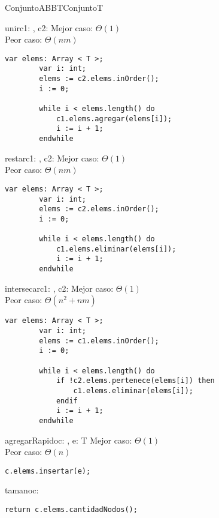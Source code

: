 \begin{module}{ConjuntoABB}{T}{Conjunto}{T}
	\begin{proc}{unir}{\Inout c1: \moduletype, \In c2: \moduletype}{}
		Mejor caso: $\Theta(1)$\\
		Peor caso: $\Theta(nm)$
		\begin{lstlisting}[numbers=none,frame=none]
		var elems: Array < T >;
		var i: int;
		elems := c2.elems.inOrder();
		i := 0;

		while i < elems.length() do
			c1.elems.agregar(elems[i]);
			i := i + 1;
		endwhile
		\end{lstlisting}
	\end{proc}

	\begin{proc}{restar}{\Inout c1: \moduletype, \In c2: \moduletype}{}
		Mejor caso: $\Theta(1)$\\
		Peor caso: $\Theta(nm)$
		\begin{lstlisting}[numbers=none,frame=none]
		var elems: Array < T >;
		var i: int;
		elems := c2.elems.inOrder();
		i := 0;

		while i < elems.length() do
			c1.elems.eliminar(elems[i]);
			i := i + 1;
		endwhile
		\end{lstlisting}
	\end{proc}

	\pagebreak

	\begin{proc}{intersecar}{\Inout c1: \moduletype, \In c2: \moduletype}{}
		Mejor caso: $\Theta(1)$\\
		Peor caso: $\Theta(n^2 + nm)$
		\begin{lstlisting}[numbers=none,frame=none]
		var elems: Array < T >;
		var i: int;
		elems := c1.elems.inOrder();
		i := 0;

		while i < elems.length() do
			if !c2.elems.pertenece(elems[i]) then
				c1.elems.eliminar(elems[i]);
			endif
			i := i + 1;
		endwhile
		\end{lstlisting}
	\end{proc}

	\begin{proc}{agregarRapido}{\Inout c: \moduletype, \In e: T}{}
		Mejor caso: $\Theta(1)$\\
		Peor caso: $\Theta(n)$
		\begin{lstlisting}[numbers=none,frame=none]
		c.elems.insertar(e);
		\end{lstlisting}
	\end{proc}

	\begin{proc}{tamano}{\In c: \moduletype}{\Int}
		\begin{lstlisting}[numbers=none,frame=none]
		return c.elems.cantidadNodos();
		\end{lstlisting}
	\end{proc}
\end{module}

